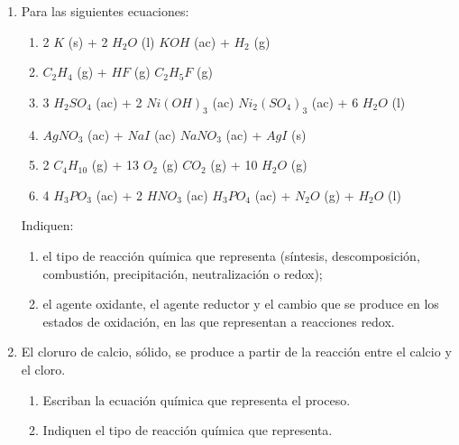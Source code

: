 \documentclass[../Práctica.root.tex]{subfiles}
\begin{document}
\begin{enumerate}
    \item Para las siguientes ecuaciones:
          \begin{enumerate}
              \item 2 $K$ (s) + 2 $H_2O$ (l)  $KOH$ (ac) + $H_2$ (g)
              \item $C_2H_4$ (g) + $HF$ (g) \to $C_2H_5F$ (g)
              \item 3 $H_2SO_4$ (ac) + 2 $Ni(OH)_3$ (ac) \to $Ni_2(SO_4)_3$ (ac) + 6 $H_2O$ (l)
              \item $AgNO_3$ (ac) + $NaI$ (ac) \to $NaNO_3$ (ac) + $AgI$ (s)
              \item 2 $C_4H_{10}$ (g) + 13 $O_2$ (g)  $CO_2$ (g) + 10 $H_2O$ (g)
              \item 4 $H_3PO_3$ (ac) + 2 $HNO_3$ (ac)  $H_3PO_4$ (ac) + $N_2O$ (g) + $H_2O$ (l)
          \end{enumerate}
          Indiquen:
          \begin{enumerate}
              \item el tipo de reacción química que representa (síntesis, descomposición, combustión,
                    precipitación, neutralización o redox);
              \item el agente oxidante, el agente reductor y el cambio que se produce en los estados de
                    oxidación, en las que representan a reacciones redox.
          \end{enumerate}
          
    \item El cloruro de calcio, sólido, se produce a partir de la reacción entre el calcio y el cloro.
          \begin{enumerate}
              \item Escriban la ecuación química que representa el proceso.
              \item Indiquen el tipo de reacción química que representa.
          \end{enumerate}
\end{enumerate}
\end{document}
